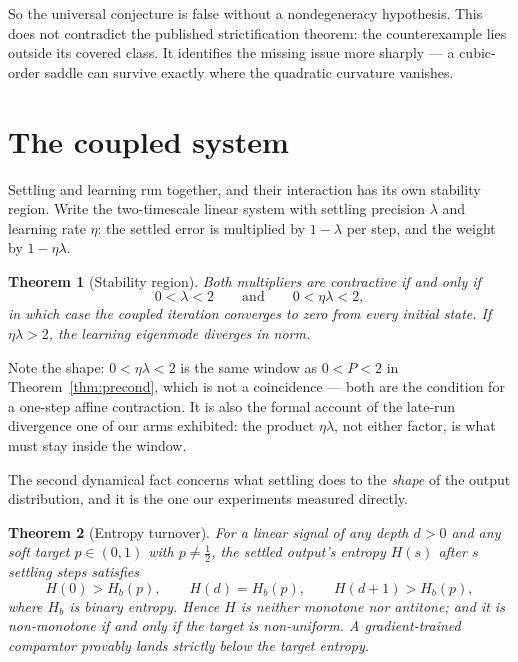 \documentclass[11pt]{article}
\newtheorem{theorem}{Theorem}[section]
\begin{document}
So the universal conjecture is false without a nondegeneracy hypothesis. This does not
contradict the published strictification theorem: the counterexample lies outside its
covered class. It identifies the missing issue more sharply --- a cubic-order saddle can
survive exactly where the quadratic curvature vanishes.

\section{The coupled system}

Settling and learning run together, and their interaction has its own stability region.
Write the two-timescale linear system with settling precision $\lambda$ and learning rate
$\eta$: the settled error is multiplied by $1-\lambda$ per step, and the weight by
$1-\eta\lambda$.

\begin{theorem}[Stability region]\label{thm:coupled}
Both multipliers are contractive if and only if
\[
0 < \lambda < 2 \qquad\text{and}\qquad 0 < \eta\lambda < 2 ,
\]
in which case the coupled iteration converges to zero from every initial state.
If $\eta\lambda > 2$, the learning eigenmode diverges in norm.
\end{theorem}

Note the shape: $0 < \eta\lambda < 2$ is the same window as $0 < P < 2$ in
Theorem~\ref{thm:precond}, which is not a coincidence --- both are the condition for a
one-step affine contraction. It is also the formal account of the late-run divergence one
of our arms exhibited: the product $\eta\lambda$, not either factor, is what must stay
inside the window.

The second dynamical fact concerns what settling does to the \emph{shape} of the output
distribution, and it is the one our experiments measured directly.

\begin{theorem}[Entropy turnover]\label{thm:turnover}
For a linear signal of any depth $d > 0$ and any soft target $p \in (0,1)$ with
$p \neq \tfrac12$, the settled output's entropy $H(s)$ after $s$ settling steps satisfies
\[
H(0) > H_b(p), \qquad H(d) = H_b(p), \qquad H(d+1) > H_b(p),
\]
where $H_b$ is binary entropy. Hence $H$ is neither monotone nor antitone; and it is
non-monotone \emph{if and only if} the target is non-uniform. A gradient-trained
comparator provably lands strictly below the target entropy.
\end{theorem}
\end{document}
